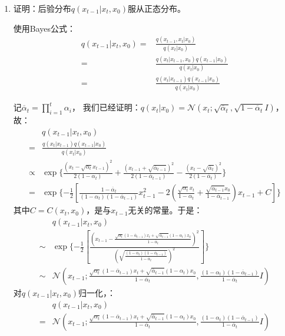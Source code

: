 \documentclass[12pt, a4paper]{article}
\newcommand{\NN}{\mathcal{N}}
\newcommand{\al}{\overline{\alpha}}
\begin{document}
\begin{enumerate}
            在扩散模型中，我们选取了$\beta_t = c \in (0, 1]$，于是：$\alpha_t = 1 - \beta_t$的上界应严格小于$1$。
            因此，在$t \rightarrow \infty$时，$\prod \limits_{i=1}^{t} \alpha_i \rightarrow 0$，即有：
            \begin{align}
            x_t \rightarrow \epsilon \sim \NN(0, I)
            \end{align}

        \item 证明：后验分布$q(x_{t - 1} \vert x_t, x_0)$服从正态分布。

            使用Bayes公式：
            \begin{align*}
            q(x_{t - 1} \vert x_t, x_0)
            =& \frac{q(x_{t - 1}, x_t \vert x_0)}{q(x_t \vert x_0)} \\
            =& \frac{q(x_t \vert x_{t - 1}, x_0) q(x_{t - 1} \vert x_0)}{q(x_t \vert x_0)} \\
            =& \frac{q(x_t \vert x_{t - 1}) q(x_{t - 1} \vert x_0)}{q(x_t \vert x_0)}
            \end{align*}

            记$\al_t = \prod \limits_{i=1}^{t} \alpha_i$，
            我们已经证明：$q(x_t \vert x_0) = \NN (x_t; \sqrt{\al_t}, \sqrt{1 - \al_t} I)$，故：
            \begin{align*}
            &q(x_{t - 1} \vert x_t, x_0) \\
            =& \frac{q(x_t \vert x_{t - 1}) q(x_{t - 1} \vert x_0)}{q(x_t \vert x_0)} \\
            \varpropto& \exp\{\frac{(x_t - \sqrt{\alpha_t} x_{t - 1})^2}{2 (1 - \alpha_t)} + \frac{(x_{t - 1} + \sqrt{\al_{t - 1}})^2}{2 (1 - \al_{t - 1})} - \frac{(x_t - \sqrt{\al_t})^2}{2 (1 - \al_t)}\} \\
            =& \exp\{-\frac{1}{2} [\frac{1 - \al_t}{(1 - \alpha_t)(1 - \al_{t - 1})} x_{t - 1}^2 - 2(\frac{\sqrt{\alpha_t} x_t}{1 - \alpha_t} + \frac{\sqrt{\al_{t - 1}} x_0}{1 - \al_{t - 1}}) x_{t - 1} + C]\}
            \end{align*}
            其中$C = C(x_t, x_0)$，是与$x_{t - 1}$无关的常量。于是：
            \begin{align*}
            &q(x_{t - 1} \vert x_t, x_0) \\
            \sim& \exp\{-\frac{1}{2} [\frac{(x_{t - 1} - \frac{\sqrt{\alpha_t} (1 - \al_{t - 1}) x_t + \sqrt{\al_{t - 1}} (1 - \alpha_t) x_0}{1 - \al_t})^2}{(\sqrt{\frac{(1 - \alpha_t) (1 - \al_{t - 1})}{1 - \al_t}})^2}]\} \\
            \sim& \NN(x_{t - 1}; \frac{\sqrt{\alpha_t} (1 - \al_{t - 1}) x_t + \sqrt{\al_{t - 1}} (1 - \alpha_t) x_0}{1 - \al_t}, \frac{(1 - \alpha_t) (1 - \al_{t - 1})}{1 - \al_t} I)
            \end{align*}
            对$q(x_{t - 1} \vert x_t, x_0)$归一化，：
            \begin{align*}
            &q(x_{t - 1} \vert x_t, x_0) \\
            =& \NN(x_{t - 1}; \frac{\sqrt{\alpha_t} (1 - \al_{t - 1}) x_t + \sqrt{\al_{t - 1}} (1 - \alpha_t) x_0}{1 - \al_t}, \frac{(1 - \alpha_t) (1 - \al_{t - 1})}{1 - \al_t} I)
            \end{align*}


\end{enumerate}
\end{document}

